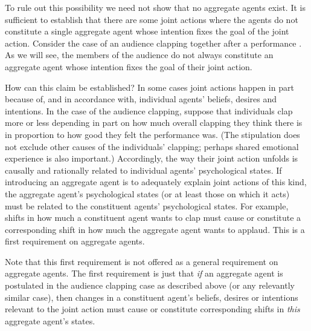 \documentclass[12pt,a4paper]{extarticle}
\begin{document}
To rule out this possibility we need not show that no aggregate agents exist.  It is sufficient to establish that there are some joint actions where the agents do not constitute a single aggregate agent whose intention fixes the goal of the joint action.  Consider the case of an audience clapping together after a performance \citep{Bratman:2009lv}.  As we will see, the members of the audience do not always constitute an aggregate agent whose intention fixes the goal of their joint action.

How can this claim be established?  In some cases joint actions happen in part because of, and in accordance with, individual agents' beliefs, desires and intentions.  In the case of the audience clapping, suppose that individuals clap more or less depending in part on how much overall clapping they think there is in proportion to how good they felt the performance was.  (The stipulation does not exclude other causes of the individuals' clapping; perhaps shared emotional experience is also important.)  Accordingly, the way their joint action unfolds is causally and rationally related to individual agents' psychological states.  If introducing an aggregate agent is to adequately explain joint actions of this kind, the aggregate agent's psychological states (or at least those on which it acts) must be related to the constituent agents' psychological states.  For example, shifts in how much a constituent agent wants to clap must cause or constitute a corresponding shift in how much the aggregate agent wants to applaud.  This is a first requirement on aggregate agents.


Note that this first requirement is not offered as a general requirement on aggregate agents.  
The first requirement is just that \emph{if} an aggregate agent is postulated in the audience clapping case as described above (or any relevantly similar case), then changes in a constituent agent's beliefs, desires or intentions relevant to the joint action must cause or constitute corresponding shifts in  \emph{this} aggregate agent's states.
\end{document}
